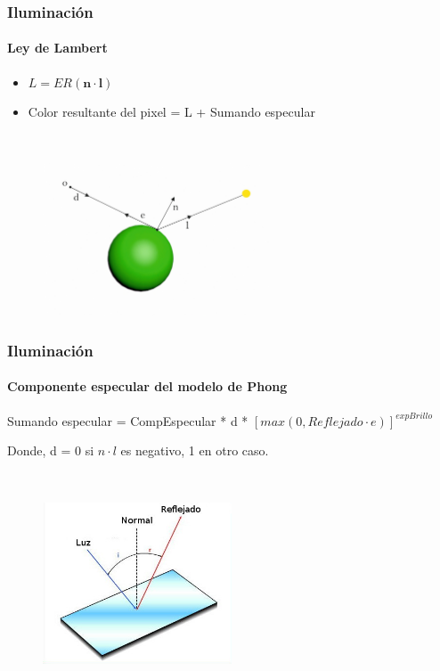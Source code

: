 \documentclass{beamer}
\begin{document}
	\begin{frame}
		\frametitle{Iluminación}
		\framesubtitle{Ley de Lambert}
		
		\begin{itemize}
			\item $L = ER(\textbf{n}\cdot \textbf{l})$
			\item Color resultante del pixel = L + Sumando especular
		\end{itemize}
		
		${ }$\\
		
		\begin{figure}[h]
			\includegraphics[width=0.6\textwidth]{imagenes/Imagen3t}
		\end{figure}
		
	\end{frame}
	
	\begin{frame}
		\frametitle{Iluminación}
		\framesubtitle{Componente especular del modelo de Phong}
		
		Sumando especular = CompEspecular * d *  $[max(0, Reflejado \cdot e)]^{expBrillo}$
		
		Donde, d = 0 si $n \cdot l$ es negativo, 1 en otro caso.
		
		${ }$\\
		
		\begin{figure}[h]
			\includegraphics[width=0.5\textwidth]{imagenes/reflexion_luz}
		\end{figure}
		
	\end{frame}
	
\end{document}
